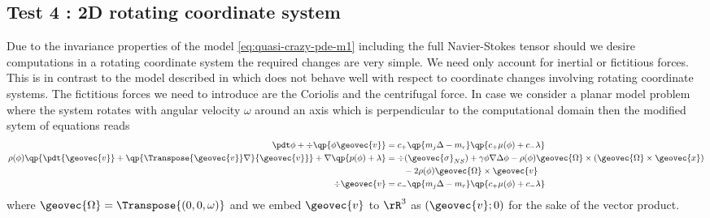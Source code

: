 \documentclass[final]{amsart}
\numberwithin{equation}{section}
\begin{document}
\subsection{Test 4 : 2D rotating coordinate system}
\label{sec:rotate}

Due to the invariance properties of the model
\eqref{eq:quasi-crazy-pde-m1} including the full Navier-Stokes tensor
should we desire computations in a rotating coordinate system the
required changes are very simple. We need only account for inertial or
fictitious forces.  This is in contrast to the model described in
\cite{AGG} which does not behave well with respect to coordinate
changes involving rotating coordinate systems. The fictitious forces
we need to introduce are the Coriolis and the centrifugal force. In
case we consider a planar model problem where the system rotates with
angular velocity $\omega$ around an axis which is perpendicular to the
computational domain then the modified sytem of equations reads
\begin{equation}
  \label{eq:quasi-crazy-pde-coriolis}
  \begin{split}
  \pdt \phi + \div\qp{\phi{\geovec{v}}} 
  &=
  c_+ \qp{m_j \Delta - m_r}\qp{c_+ \mu(\phi) + c_- \lambda} 
  \\
  \rho(\phi)
  \qp{
    \pdt {{\geovec{v}}}
    +
    \qp{\Transpose{{\geovec{v}}} \nabla}{\geovec{v}}
  }
  +
  \nabla \qp{p(\phi)+\lambda}
  &= 
   \div( {\geovec{\sigma}}_{NS})
  +
  \gamma \phi \nabla\Delta \phi 
  - \rho(\phi) {{\geovec{\Omega}}} \times ({{\geovec{\Omega}} } \times {{\geovec{x}}}) 
\\
&\qquad - 2\rho(\phi) {\geovec{\Omega}} \times {\geovec{v}}
  \\
  \div{{\geovec{v}}} 
  &=
  c_-
  \qp{m_j \Delta - m_r}\qp{c_+ \mu(\phi) + c_- \lambda} 
  \end{split}
\end{equation}
where ${\geovec{\Omega}} = \Transpose{(0,0,\omega)}$ and we embed ${\geovec{v}} $
to $\rR^3$ as $({\geovec{v}}; 0)$ for the sake of the vector product.
\end{document}
